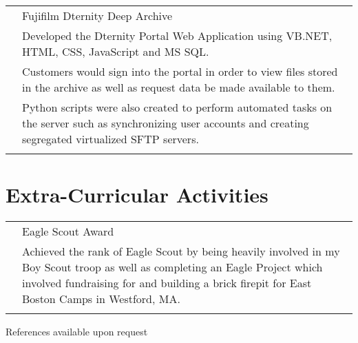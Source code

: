 \documentclass[12pt]{article}
\begin{document}
\begin{tabular}{p{2.7cm}|p{15.0cm}}
	\centering 2015 & Fujifilm Dternity Deep Archive\\&\small{Developed the Dternity Portal Web Application using VB.NET, HTML, CSS, JavaScript and MS SQL.}\\&\small{Customers would sign into the portal in order to view files stored in the archive as well as request data be made available to them.}\\&\small{Python scripts were also created to perform automated tasks on the server such as synchronizing user accounts and creating segregated virtualized SFTP servers.}\\\multicolumn{2}{c}{} \\
\end{tabular}

\section*{\selectfont Extra-Curricular Activities}
\begin{tabular}{p{2.7cm}|p{15.0cm}}
	& Eagle Scout Award\\&\small{Achieved the rank of Eagle Scout by being heavily involved in my Boy Scout troop as well as completing an Eagle Project which involved fundraising for and building a brick firepit for East Boston Camps in Westford, MA.}\\\multicolumn{2}{c}{} \\
\end{tabular}

\vspace{0.8cm}
\centering References available upon request
\end{document}
